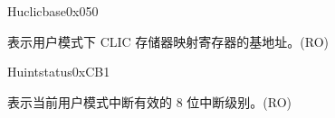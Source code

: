 \begin{register}{H}{uclicbase}{0x050}\label{regdesc:UCLICBASE_REG}
%
\regnewline%
\begin{regdesc}\begin{reglist}
\label{fielddesc:UCLICBASE}\item [UCLICBASE] 表示用户模式下 CLIC 存储器映射寄存器的基地址。(RO)
\end{reglist}\end{regdesc}
\end{register}


\begin{register}{H}{uintstatus}{0xCB1}
\label{regdesc:UINTSTATUS}
%
%
\regnewline%
\begin{regdesc}\begin{reglist}
\label{fielddesc:UINTSTATUS_UIL}\item [UIL] 表示当前用户模式中断有效的 8 位中断级别。(RO)
\end{reglist}\end{regdesc}
\end{register}


